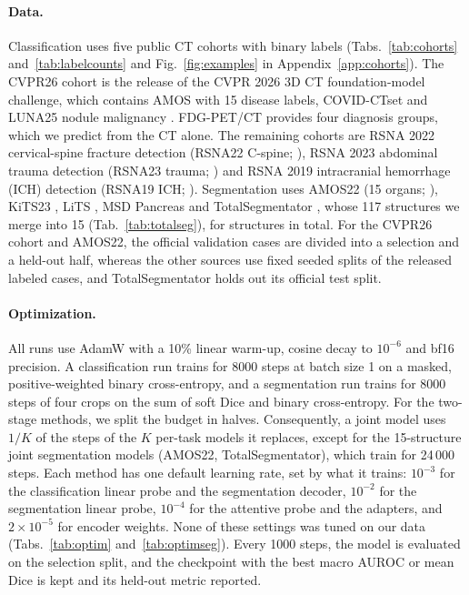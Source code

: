 \paragraph{Data.} Classification uses five public CT cohorts with \numLabelsN{} binary labels (Tabs.~\ref{tab:cohorts} and~\ref{tab:labelcounts} and Fig.~\ref{fig:examples} in Appendix~\ref{app:cohorts}). The CVPR26 cohort is the release of the CVPR 2026 3D CT foundation-model challenge, which contains AMOS \citep{ji2022amos} with 15 disease labels, COVID-CTset \citep{rahimzadeh2021covidctset} and LUNA25 nodule malignancy \citep{peeters2026luna25}. FDG-PET/CT \citep{gatidis2022fdgpetct} provides four diagnosis groups, which we predict from the CT alone. The remaining cohorts are RSNA 2022 cervical-spine fracture detection (RSNA22 C-spine; \citealp{lin2023rsnacsfdata}), RSNA 2023 abdominal trauma detection (RSNA23 trauma; \citealp{rudie2024ratic}) and RSNA 2019 intracranial hemorrhage (ICH) detection (RSNA19 ICH; \citealp{flanders2020rsnaich}). Segmentation uses AMOS22 (15 organs; \citealp{ji2022amos}), KiTS23 \citep{heller2023kits21}, LiTS \citep{bilic2023lits}, MSD Pancreas \citep{antonelli2022msd} and TotalSegmentator \citep{wasserthal2023totalsegmentator,wasserthal2026totalsegdata}, whose 117 structures we merge into 15 (Tab.~\ref{tab:totalseg}), for \numStructuresN{} structures in total. For the CVPR26 cohort and AMOS22, the official validation cases are divided into a selection and a held-out half, whereas the other sources use fixed seeded splits of the released labeled cases, and TotalSegmentator holds out its official test split.

\paragraph{Optimization.} All runs use AdamW with a 10\% linear warm-up, cosine decay to $10^{-6}$ and bf16 precision. A classification run trains for 8000 steps at batch size 1 on a masked, positive-weighted binary cross-entropy, and a segmentation run trains for 8000 steps of four crops on the sum of soft Dice and binary cross-entropy. For the two-stage methods, we split the budget in halves. Consequently, a joint model uses $1/K$ of the steps of the $K$ per-task models it replaces, except for the 15-structure joint segmentation models (AMOS22, TotalSegmentator), which train for 24\,000 steps. Each method has one default learning rate, set by what it trains: $10^{-3}$ for the classification linear probe and the segmentation decoder, $10^{-2}$ for the segmentation linear probe, $10^{-4}$ for the attentive probe and the adapters, and $2\times10^{-5}$ for encoder weights. None of these settings was tuned on our data (Tabs.~\ref{tab:optim} and~\ref{tab:optimseg}). Every 1000 steps, the model is evaluated on the selection split, and the checkpoint with the best macro AUROC or mean Dice is kept and its held-out metric reported.

